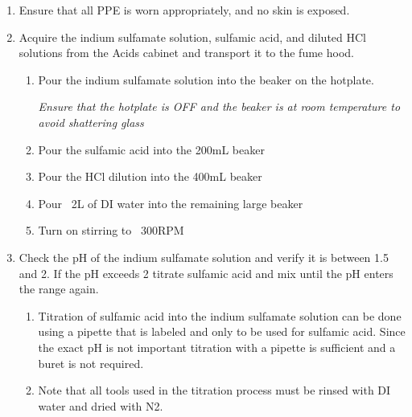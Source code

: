 \begin{center}
\begin{framed}
\begin{minipage}{0.8\textwidth}
\begin{enumerate}
                \item Ensure that all PPE is worn appropriately, and no skin is exposed.
                \item Acquire the indium sulfamate solution, sulfamic acid, and diluted HCl solutions from the Acids cabinet and transport it to the fume hood.
                \begin{enumerate}
                    \item Pour the indium sulfamate solution into the beaker on the hotplate.


                    \textit{Ensure that the hotplate is OFF and the beaker is at room temperature to avoid shattering glass}
                    \item Pour the sulfamic acid into the 200mL beaker
                    \item Pour the HCl dilution into the 400mL beaker
                    \item Pour ~2L of DI water into the remaining large beaker
                    \item Turn on stirring to ~300RPM
                \end{enumerate}

                \item Check the pH of the indium sulfamate solution and verify it is between 1.5 and 2. If the pH exceeds 2 titrate sulfamic acid and mix until the pH enters the range again.
                \begin{enumerate}
                    \item Titration of sulfamic acid into the indium sulfamate solution can be done using a pipette that is labeled and only to be used for sulfamic acid. Since the exact pH is not important titration with a pipette is sufficient and a buret is not required.
                    \item Note that all tools used in the titration process must be rinsed with DI water and dried with N2.
                \end{enumerate}
            \end{enumerate}
        \end{minipage}
    \end{framed}
\end{center}


